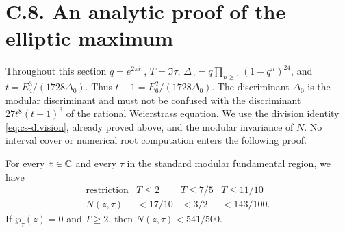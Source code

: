 \section{C.8. An analytic proof of the elliptic maximum}

Throughout this section $q=e^{2\pi i\tau}$, $T=\Im\tau$,
$\Delta_0=q\prod_{n\ge1}(1-q^n)^{24}$, and
$t=E_4^3/(1728\Delta_0)$. Thus $t-1=E_6^2/(1728\Delta_0)$.
The discriminant $\Delta_0$ is the modular discriminant and must not
be confused with the discriminant $27t^8(t-1)^3$ of the rational
Weierstrass equation. We use the division identity
\eqref{eq:cs-division}, already proved above, and the modular
invariance of $N$. No interval cover or numerical root computation
enters the following proof.

\begin{statement}
For every $z\in\mathbb C$ and every $\tau$ in the standard modular
fundamental region, we have
\[
 \begin{array}{c|ccc}
 \text{restriction}&T\le2&T\le7/5&T\le11/10\\ \hline
 N(z,\tau)&<17/10&<3/2&<143/100.
 \end{array}
\]
If $\wp_\tau(z)=0$ and $T\ge2$, then $N(z,\tau)<541/500$.
\end{statement}
